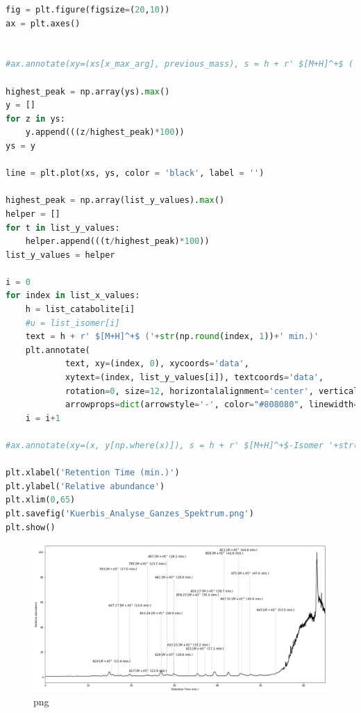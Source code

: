 \begin{lstlisting}[language=Python]
fig = plt.figure(figsize=(20,10))
ax = plt.axes()


#ax.annotate(xy=(xs[x_max_arg], previous_mass), s = h + r' $[M+H]^+$ ('+str(np.round(xs[x_max_arg], 1))+' min.)')

highest_peak = np.array(ys).max()
y = []
for z in ys:
    y.append(((z/highest_peak)*100))
ys = y

line = plt.plot(xs, ys, color = 'black', label = '')

highest_peak = np.array(list_y_values).max()
helper = []
for t in list_y_values:
    helper.append(((t/highest_peak)*100))
list_y_values = helper

i = 0
for index in list_x_values:
    h = list_catabolite[i]
    #u = list_isomer[i]
    text = h + r' $[M+H]^+$ ('+str(np.round(index, 1))+' min.)'
    plt.annotate(
            text, xy=(index, 0), xycoords='data',
            xytext=(index, list_y_values[i]), textcoords='data',
            rotation=0, size=12, horizontalalignment='center', verticalalignment='bottom',
            arrowprops=dict(arrowstyle='-', color="#808080", linewidth=0.4, shrinkA=0.05, shrinkB=1))
    i = i+1
        
#ax.annotate(xy=(x, y[np.where(x)]), s = h + r' $[M+H]^+$-Isomer '+str(u)+' ('+str(np.round(x, 1))+' min.)')

plt.xlabel('Retention Time (min.)')
plt.ylabel('Relative abundance')
plt.xlim(0,65)
plt.savefig('Kuerbis_Analyse_Ganzes_Spektrum.png')
plt.show()
\end{lstlisting}

\begin{figure}[htbp]
\centering
\includegraphics{VWA_Analyse_LC-ESI-MS_files/VWA_Analyse_LC-ESI-MS_13_0.png}
\caption{png}
\end{figure}
